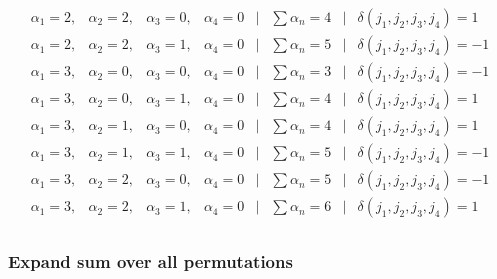 \documentclass[a4paper,11pt,twoside]{report}
\begin{document}
\[\begin{matrix}
		\alpha_1 = 2, & \alpha_2 = 2, & \alpha_3 = 0, & \alpha_4 = 0& | & \sum \alpha_{n} = 4&| & \delta(j_1,j_2,j_3,j_4) = 1\\
		\alpha_1 = 2, & \alpha_2 = 2, & \alpha_3 = 1, & \alpha_4 = 0& | & \sum \alpha_{n} = 5&| & \delta(j_1,j_2,j_3,j_4) = -1\\
		\alpha_1 = 3, & \alpha_2 = 0, & \alpha_3 = 0, & \alpha_4 = 0& | & \sum \alpha_{n} = 3&| & \delta(j_1,j_2,j_3,j_4) = -1\\
		\alpha_1 = 3, & \alpha_2 = 0, & \alpha_3 = 1, & \alpha_4 = 0& | & \sum \alpha_{n} = 4&| & \delta(j_1,j_2,j_3,j_4) = 1\\
		\alpha_1 = 3, & \alpha_2 = 1, & \alpha_3 = 0, & \alpha_4 = 0& | & \sum \alpha_{n} = 4&| & \delta(j_1,j_2,j_3,j_4) = 1\\
		\alpha_1 = 3, & \alpha_2 = 1, & \alpha_3 = 1, & \alpha_4 = 0& | & \sum \alpha_{n} = 5&| & \delta(j_1,j_2,j_3,j_4) = -1\\
		\alpha_1 = 3, & \alpha_2 = 2, & \alpha_3 = 0, & \alpha_4 = 0& | & \sum \alpha_{n} = 5&| & \delta(j_1,j_2,j_3,j_4) = -1\\
		\alpha_1 = 3, & \alpha_2 = 2, & \alpha_3 = 1, & \alpha_4 = 0& | & \sum \alpha_{n} = 6&| & \delta(j_1,j_2,j_3,j_4) = 1\\
\end{matrix} \]

\subsubsection{Expand sum over all permutations}%
\label{ssub:expand_sum_over_all_permutations}
\end{document}

